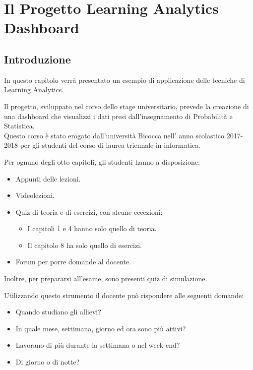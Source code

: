 \chapter{Il Progetto Learning Analytics Dashboard}

\section{Introduzione}

In questo capitolo verrà presentato un esempio di applicazione delle tecniche di Learning Analytics.

Il progetto, sviluppato nel corso dello stage universitario, prevede la creazione di una dashboard che visualizzi i dati presi dall'insegnamento di Probabilità e Statistica. \\
Questo corso è stato erogato dall'università Bicocca nell' anno scolastico 2017-2018 per gli studenti del corso di laurea triennale in informatica.

Per ognuno degli otto capitoli, gli studenti hanno a disposizione:

\begin{itemize}

\item Appunti delle lezioni.
\item Videolezioni.
\item Quiz di teoria e di esercizi, con alcune eccezioni:
\begin{itemize}
   \item I capitoli 1 e 4 hanno solo quello di teoria.
   \item Il capitolo 8 ha solo quello di esercizi.
\end{itemize}
\item Forum per porre domande al docente.

\end{itemize}

Inoltre, per prepararsi all'esame, sono presenti quiz di simulazione.

\clearpage

Utilizzando questo strumento il docente può rispondere alle seguenti domande:

\begin{itemize}

\item Quando studiano gli allievi? 
\item In quale mese, settimana, giorno ed ora sono più attivi?
\item Lavorano di più durante la settimana o nel week-end?
\item Di giorno o di notte?

\end{itemize}

